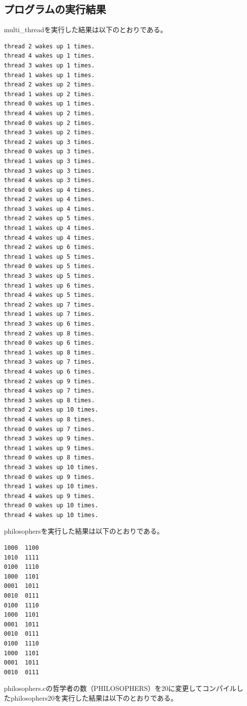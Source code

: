 \documentclass[a4j]{celb-report}
\begin{document}
\subsection{プログラムの実行結果}
multi\_threadを実行した結果は以下のとおりである。
\begin{lstlisting}[caption=multi\_thread実行結果, basicstyle=\ttfamily\footnotesize, frame=single]
thread 2 wakes up 1 times.
thread 4 wakes up 1 times.
thread 3 wakes up 1 times.
thread 1 wakes up 1 times.
thread 2 wakes up 2 times.
thread 1 wakes up 2 times.
thread 0 wakes up 1 times.
thread 4 wakes up 2 times.
thread 0 wakes up 2 times.
thread 3 wakes up 2 times.
thread 2 wakes up 3 times.
thread 0 wakes up 3 times.
thread 1 wakes up 3 times.
thread 3 wakes up 3 times.
thread 4 wakes up 3 times.
thread 0 wakes up 4 times.
thread 2 wakes up 4 times.
thread 3 wakes up 4 times.
thread 2 wakes up 5 times.
thread 1 wakes up 4 times.
thread 4 wakes up 4 times.
thread 2 wakes up 6 times.
thread 1 wakes up 5 times.
thread 0 wakes up 5 times.
thread 3 wakes up 5 times.
thread 1 wakes up 6 times.
thread 4 wakes up 5 times.
thread 2 wakes up 7 times.
thread 1 wakes up 7 times.
thread 3 wakes up 6 times.
thread 2 wakes up 8 times.
thread 0 wakes up 6 times.
thread 1 wakes up 8 times.
thread 3 wakes up 7 times.
thread 4 wakes up 6 times.
thread 2 wakes up 9 times.
thread 4 wakes up 7 times.
thread 3 wakes up 8 times.
thread 2 wakes up 10 times.
thread 4 wakes up 8 times.
thread 0 wakes up 7 times.
thread 3 wakes up 9 times.
thread 1 wakes up 9 times.
thread 0 wakes up 8 times.
thread 3 wakes up 10 times.
thread 0 wakes up 9 times.
thread 1 wakes up 10 times.
thread 4 wakes up 9 times.
thread 0 wakes up 10 times.
thread 4 wakes up 10 times.
\end{lstlisting}
philosophersを実行した結果は以下のとおりである。
\begin{lstlisting}[caption=philosophers実行結果, basicstyle=\ttfamily\footnotesize, frame=single]
1000  1100
1010  1111
0100  1110
1000  1101
0001  1011
0010  0111
0100  1110
1000  1101
0001  1011
0010  0111
0100  1110
1000  1101
0001  1011
0010  0111
\end{lstlisting}
philosophers.cの哲学者の数（PHILOSOPHERS）を20に変更してコンパイルしたphilosophers20を実行した結果は以下のとおりである。
\end{document}
